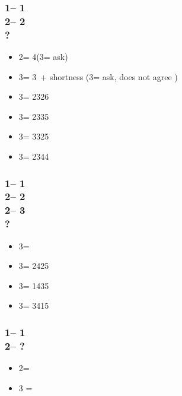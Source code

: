 \documentclass[12pt, a4paper]{report}
\begin{document}
{{        \subsubsection*{1\clubs -- 1\hearts\\
                        2\hearts -- 2\spades\\
                        ?}
        \begin{itemize}
            \item 2\nt = 4\hearts (3\clubs = ask)
            \item 3\clubs = 3\hearts\ + shortness (3\diams = ask, does not agree \hearts)
            \item 3\diams = 2326
            \item 3\hearts = 2335
            \item 3\spades = 3325
            \item 3\nt = 2344
        \end{itemize}

        \subsubsection*{1\clubs -- 1\hearts\\
                        2\hearts -- 2\spades\\
                        2\nt -- 3\clubs\\
                        ?}
        \begin{itemize}
            \item 3\diams = \bal
            \item 3\hearts = 2425
            \item 3\spades = 1435
            \item 3\nt = 3415
        \end{itemize}

        \subsubsection*{1\clubs -- 1\spades\\
                        2\spades -- ?}
        \begin{itemize}
            \item 2\nt = \gf
            \item 3 = \inv
        \end{itemize}

}}
\end{document}
